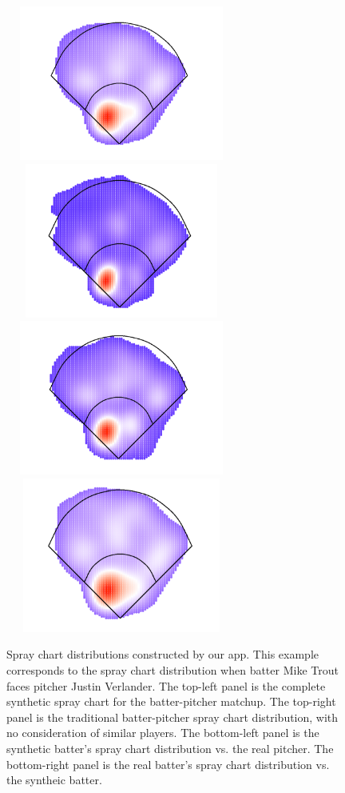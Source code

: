 \documentclass[11pt]{article}
\begin{document}
\begin{figure}
\centering
    \includegraphics[width=3in, height=2in]{trout_verlander_master.png}
    \includegraphics[width=3in, height=2in]{trout_traditional.png}
    \includegraphics[width=3in, height=2in]{synthetic_trout.png}
    \includegraphics[width=3in, height=2in]{synthetic_verlander.png}    
    \caption{Spray chart distributions constructed by our app.  This example 
    corresponds to the spray chart distribution when batter Mike Trout faces 
    pitcher Justin Verlander.
    The top-left panel is the complete synthetic spray chart for 
      the batter-pitcher matchup.
    The top-right panel is the traditional batter-pitcher spray chart 
      distribution, with no consideration of similar players.
    The bottom-left panel is the synthetic batter's spray chart distribution 
      vs. the real pitcher. 
    The bottom-right panel is the real batter's spray chart distribution 
      vs. the syntheic batter.}
    \label{spraydists}
\end{figure}
\end{document}
